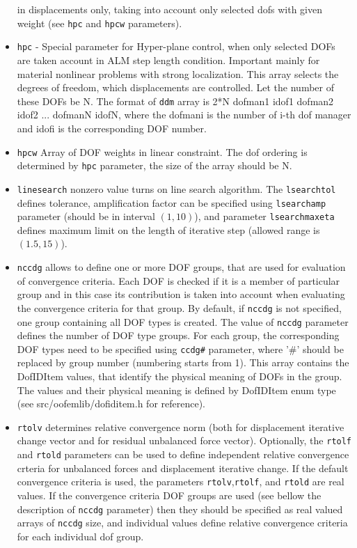 \documentclass[a4paper]{article}
\newcommand{\param}[1]{\texttt{#1}} %
\begin{document}
\begin{itemize}
in displacements only, taking into account only selected dofs with
given weight (see \param{hpc} and \param{hpcw} parameters).
\item \param{hpc} - Special parameter for Hyper-plane control, when only
selected DOFs are taken account in ALM step length
condition. Important mainly for material nonlinear problems with
strong localization. This array selects the degrees of freedom,
which displacements are controlled. Let the number of these DOFs be N.
The format of \param{ddm} array is 2*N dofman1 idof1
dofman2 idof2 ... dofmanN idofN, where the dofmani is the number of i-th dof manager  and idofi is the
corresponding DOF number.
\item \param{hpcw} Array of DOF weights in linear constraint. The
dof ordering is determined by \param{hpc} parameter, the size of the array should
be N.
\item \param{linesearch} nonzero value turns on line search
  algorithm. The \param{lsearchtol} defines tolerance, amplification
  factor can be specified using \param{lsearchamp} parameter (should
  be in interval $(1,10)$), and parameter \param{lsearchmaxeta}
  defines maximum limit on the length of iterative step (allowed range
  is $(1.5,15)$).
\item \param{nccdg} allows to define one or more DOF groups, that are used for evaluation of convergence criteria. Each DOF is checked if it is a member of particular group and in this case its contribution is taken into account when evaluating the convergence criteria for that group. By default, if \param{nccdg} is not specified, one group containing all DOF types is created. The value of \param{nccdg} parameter defines the number of DOF type groups. For each group, the corresponding DOF types need to be specified using \param{ccdg\#} parameter, where '\#' should be replaced by group number (numbering starts from 1). This array contains the DofIDItem values, that identify the physical meaning of DOFs in the group. The values and their physical meaning is defined by DofIDItem enum type (see src/oofemlib/dofiditem.h for reference).
\item \param{rtolv} determines relative convergence norm (both for displacement
iterative change vector and for residual unbalanced force vector). Optionally, the \param{rtolf} and \param{rtold} parameters can be used to define
independent relative convergence crteria for unbalanced forces and displacement
iterative change. If the default convergence criteria is used,
the parameters \param{rtolv},\param{rtolf}, and \param{rtold} are real values. If the convergence criteria DOF groups are used (see bellow the description of \param{nccdg} parameter) then they should be specified as real valued arrays of \param{nccdg} size, and individual values define relative convergence criteria for each individual dof group.

\end{itemize}
\end{document}
